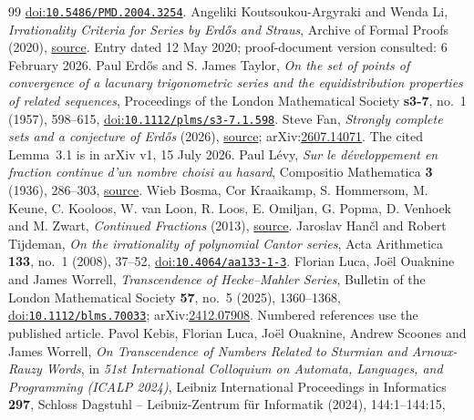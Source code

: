 \begin{thebibliography}{99}
  \href{https://doi.org/10.5486/PMD.2004.3254}{doi:\nolinkurl{10.5486/PMD.2004.3254}}.
 Angeliki Koutsoukou-Argyraki and Wenda Li,
  \emph{Irrationality Criteria for Series by Erd\H{o}s and Straus}, Archive of Formal Proofs (2020),
  \href{https://isa-afp.org/entries/Irrational_Series_Erdos_Straus.html}{source}. Entry dated 12 May 2020; proof-document version consulted: 6 February 2026.
 Paul Erd\H{o}s and S. James Taylor,
  \emph{On the set of points of convergence of a lacunary trigonometric series and the equidistribution properties of related sequences}, Proceedings of the London Mathematical Society \textbf{s3-7}, no.~1 (1957), 598--615,
  \href{https://doi.org/10.1112/plms/s3-7.1.598}{doi:\nolinkurl{10.1112/plms/s3-7.1.598}}.
 Steve Fan,
  \emph{Strongly complete sets and a conjecture of Erd\H{o}s} (2026),
  \href{https://arxiv.org/abs/2607.14071v1}{source}; arXiv:\href{https://arxiv.org/abs/2607.14071}{2607.14071}. The cited Lemma~3.1 is in arXiv v1, 15 July 2026.
 Paul L\'{e}vy,
  \emph{Sur le d\'{e}veloppement en fraction continue d'un nombre choisi au hasard}, Compositio Mathematica \textbf{3} (1936), 286--303,
  \href{https://www.numdam.org/item/CM_1936__3__286_0/}{source}.
 Wieb Bosma, Cor Kraaikamp, S. Hommersom, M. Keune, C. Kooloos, W. van Loon, R. Loos, E. Omiljan, G. Popma, D. Venhoek and M. Zwart,
  \emph{Continued Fractions} (2013),
  \href{https://www.math.ru.nl/~bosma/Students/CF.pdf}{source}.
 Jaroslav Han\v{c}l and Robert Tijdeman,
  \emph{On the irrationality of polynomial Cantor series}, Acta Arithmetica \textbf{133}, no.~1 (2008), 37--52,
  \href{https://doi.org/10.4064/aa133-1-3}{doi:\nolinkurl{10.4064/aa133-1-3}}.
 Florian Luca, Jo\"{e}l Ouaknine and James Worrell,
  \emph{Transcendence of Hecke--Mahler Series}, Bulletin of the London Mathematical Society \textbf{57}, no.~5 (2025), 1360--1368,
  \href{https://doi.org/10.1112/blms.70033}{doi:\nolinkurl{10.1112/blms.70033}}; arXiv:\href{https://arxiv.org/abs/2412.07908}{2412.07908}. Numbered references use the published article.
 Pavol Kebis, Florian Luca, Jo\"{e}l Ouaknine, Andrew Scoones and James Worrell,
  \emph{On Transcendence of Numbers Related to Sturmian and Arnoux-Rauzy Words}, in \emph{51st International Colloquium on Automata, Languages, and Programming (ICALP 2024)}, Leibniz International Proceedings in Informatics \textbf{297}, Schloss Dagstuhl -- Leibniz-Zentrum f\"{u}r Informatik (2024), 144:1--144:15,

\end{thebibliography}
